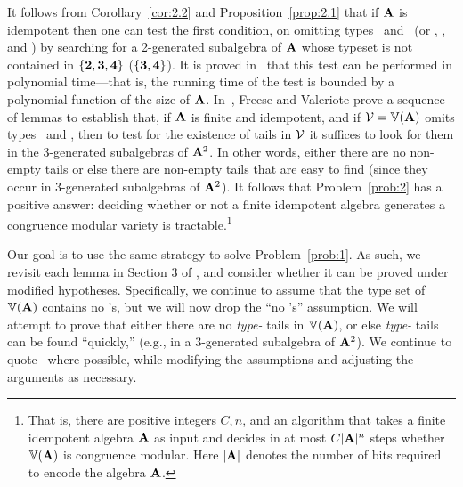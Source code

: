It follows from Corollary~\ref{cor:2.2} and Proposition~\ref{prop:2.1}
that if $\mathbf{A}$ is idempotent then one can
test the first condition, on omitting 
types \utyp\ and \styp\ (or \utyp, \atyp, and \styp) by searching
for a 2-generated subalgebra of $\mathbf{A}$ whose typeset is 
not contained in
$\{\textbf{2}, \textbf{3}, \textbf{4}\}$ ($\{\textbf{3}, \textbf{4}\}$). It is proved 
in~\cite[Sec.~6]{Freese:2009} that this
test can be performed in polynomial time---that is, the running 
time of the test
is bounded by a polynomial function of the size of $\mathbf{A}$.
In~\cite[Sec.~3]{Freese:2009}, Freese and Valeriote prove a sequence of
lemmas to establish that, if $\mathbf{A}$ is finite and idempotent, and if
$\mathcal V = \operatorname{\mathbb{V}}(\mathbf{A})$ omits types \utyp\ and \styp, 
then to test for the existence of tails
in $\mathcal{V}$ it suffices to look for them 
in the 3-generated subalgebras of $\mathbf{A}^2$.
In other words, either there are no non-empty tails
or else there are non-empty tails that are easy to find
(since they occur in 3-generated subalgebras of $\mathbf{A}^2$).
It follows that Problem~\ref{prob:2} has a positive answer:
deciding whether or not a finite idempotent algebra generates a congruence
modular variety is tractable.\footnote{That is, there are positive integers
  $C, n$, and an algorithm that takes
  a finite idempotent algebra $\mathbf{A}$ as input and decides
  in at most $C|\mathbf{A}|^n$ steps whether $\operatorname{\mathbb{V}}(\mathbf{A})$ is congruence modular.
  Here $|\mathbf{A}|$ denotes the number of bits required to encode the algebra $\mathbf{A}$.}

Our goal is to use the same strategy to solve Problem~\ref{prob:1}.
As such, we revisit each lemma in Section 3 of \cite{Freese:2009},
and consider whether it can be proved under modified hypotheses.
Specifically, we continue to assume that the type set of $\operatorname{\mathbb{V}}(\mathbf{A})$ contains no \utyp's,
but we will now drop the ``no \styp's'' assumption.  We will 
attempt to prove that
either there are no \emph{type-\atyp} tails in $\operatorname{\mathbb{V}}(\mathbf{A})$, 
or else \emph{type-\atyp}
tails can be found ``quickly,'' (e.g., in a 3-generated subalgebra of $\mathbf{A}^2$).
We continue to quote~\cite{Freese:2009} where possible,
while modifying the assumptions and adjusting the arguments as necessary.

